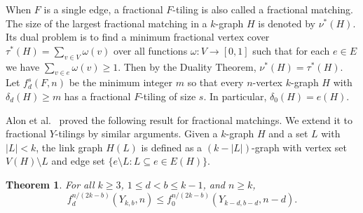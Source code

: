 \documentclass[11pt, reqno]{amsart}    	%
\newtheorem{thm}{Theorem}[section]
\theoremstyle{definition}
\numberwithin{equation}{section}
\begin{document}
	When $F$ is a single edge, a fractional $F$-tiling is also called a fractional matching.
	The size of the largest fractional matching in a $k$-graph $H$ is denoted by $\nu^*(H)$. Its dual problem is to find a minimum fractional vertex cover $ \tau^*(H)=\sum_{v\in V}\omega(v)$ over all functions $ \omega:V\to [0,1] $ such that for each $e\in E$ we have $\sum_{v\in e}\omega(v) \ge 1$. Then by the Duality Theorem, $ \nu^*(H)=\tau^*(H)$.
	Let $f_d^s(F,n)$ be the minimum integer $m$ so that every $n$-vertex $k$-graph $H$ with $\delta_d(H)\ge m$ has a fractional $F$-tiling of size $s$. In particular,  $\delta_0(H)=e(H)$.
	
	Alon et al.~\cite{AFHRRS} proved the following result for fractional matchings.
	We extend it to fractional $Y$-tilings by similar arguments.
	Given a $k$-graph $H$ and a set $L$ with $|L|<k$, the link graph $H(L)$ is defined as a $(k-|L|)$-graph with vertex set $V(H)\setminus L$ and edge set $\{e\setminus L: L\subseteq e\in E(H)\}$.
	\begin{thm}\label{tran}
		For all $k \ge 3$, $1 \le d < b \le k-1$, and $n \ge k$,
		\[
		f_d^{n/(2k-b)}(Y_{k, b}, n) \le f_0^{n/(2k-b)}(Y_{k-d, b-d}, n-d).
		\]
	\end{thm}
	
\end{document}
